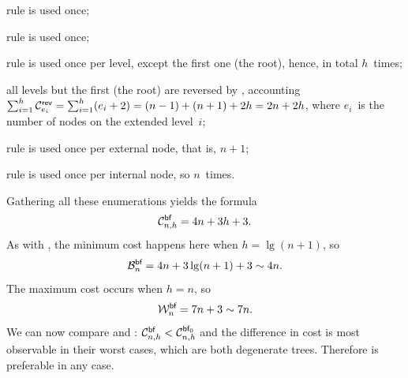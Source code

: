 \begin{itemize*}

  \item rule \clause{\nu} is used once;

  \item rule \clause{\xi} is used once;

  \item rule \clause{\pi} is used once per level, except the first one
    (the root), hence, in total \(h\)~times;

  \item all levels but the first (the root) are reversed by
    , accounting \(\sum_{i=1}^{h}\C{\fun{rev}}{e_i} =
    \sum_{i=1}^{h}(e_i+2) = (n-1)+(n+1)+ 2h = 2n +
    2h\), where \(e_i\)~is the number of
    nodes on the extended level~\(i\);

  \item rule \clause{\rho} is used once per external node, that is,
    \(n+1\);

  \item rule \clause{\sigma} is used once per internal node, so
    \(n\)~times.

\end{itemize*}
Gathering all these enumerations yields the formula
\begin{equation*}
\C{\fun{bf}}{n,h} = 4n + 3h + 3.\index{bf@$\C{\fun{bf}}{n,h}$}
\end{equation*}
As with , the minimum cost
happens here when \(h = \lg(n+1)\), so
\begin{equation*}
  \B{\fun{bf}}{n} = 4n + 3\lg(n+1) + 3 \sim 4n.
  \index{bf@$\B{\fun{bf}}{n,h}$}
\end{equation*}
The maximum cost occurs when \(h=n\), so
\begin{equation*}
  \W{\fun{bf}}{n} = 7n + 3 \sim 7n.
\end{equation*}
We can now compare  and
: \(\C{\fun{bf}}{n,h} <
\C{\fun{bf}_0}{n,h}\)
 and the difference in cost is most
observable in their worst cases, which are both degenerate
trees. Therefore  is preferable in any case.

